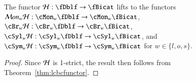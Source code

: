 \begin{thm}\label{thm:H}
The functor $\cH: \fDblf \rightarrow \fBicat$ lifts to the functors $\cM on_w \cH: \cMon_w\fDblf \rightarrow \cMon_w \fBicat$, $\cBr_w \cH: \cBr_w\fDblf \rightarrow \cBr_w \fBicat$,  $\cSyl_w\cH: \cSyl_w\fDblf \rightarrow \cSyl_w\fBicat$, and $\cSym_w \cH: \cSym_w\fDblf \rightarrow \cSym_w \fBicat$ for $w\in \{l,o,s\}$.
\end{thm}

\begin{proof}
  Since $\mathcal{H}$ is 1-strict, the result then follows from Theorem~\ref{thm:lcbcfunctor}.
\end{proof}




